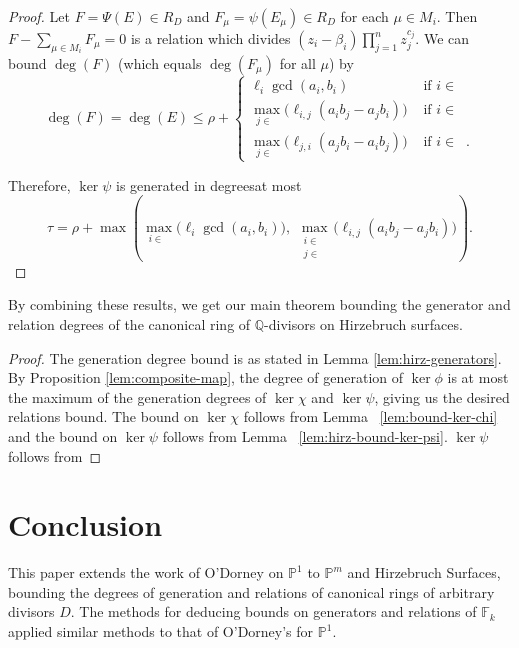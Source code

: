 \documentclass{amsart}
\theoremstyle{plain}
\theoremstyle{definition}
\theoremstyle{remark}
\numberwithin{equation}{section}
\newcommand\bq{{\mathbb Q}}
\newcommand\bp{{\mathbb P}}
\newcommand\bida{a}
\newcommand\bidb{b}
\newcommand\hirz{\mathbb{F}}
\DeclareMathOperator{\Te}{T_=}
\DeclareMathOperator{\Tp}{T_+}
\DeclareMathOperator{\Tm}{T_-}
\begin{document}
\begin{proof}
Let $F = \Psi(E) \in R_D$
 and $F_\mu = \psi(E_\mu) \in R_D$ for each $\mu \in M_i$.  
Then $F - \sum_{\mu \in M_i} F_\mu = 0$ is a relation %
which divides $(z_i - \beta_i) \prod_{j = 1}^n z_j^{c_j}$. 
We can bound $\deg(F)$ (which equals $\deg(F_\mu)$ for all $\mu$) by
\[
	\deg(F) = \deg(E) \le \rho + \begin{cases}
	\ell_i \gcd(\bida_i, \bidb_i)	&\mbox{ if } i \in \Te \\
	\max_{j \in \Tm} \bigl(\ell_{i, j} (\bida_i \bidb_j - \bida_j \bidb_i)\bigr)
	&\mbox{ if } i \in \Tp \\
	\max_{j \in \Tp} \bigl(\ell_{j, i} (\bida_j \bidb_ i - \bida_i \bidb_j) \bigr)
	&\mbox{ if } i \in \Tm. \end{cases}
	\]

\noindent
Therefore, $\ker \psi$ is generated in degreesat most
\[
	\tau = \rho
	+ \max \left(\max_{i\in \Te} \bigl(\ell_i \gcd(a_i, b_i) \bigr),
	\; \max_{\substack{i \in \Tp \\ j \in \Tm}} \bigl(\ell_{i, j}
	(\bida_i \bidb_j - \bida_j
	\bidb_i) \bigr) \right).
\]
\end{proof}

By combining these results, we get our main theorem bounding
the generator and relation degrees of the canonical ring of
$\bq$-divisors on Hirzebruch surfaces.

\hirzrestate*

\begin{proof}
The generation degree bound is as stated in Lemma \ref{lem:hirz-generators}.
By Proposition \ref{lem:composite-map}, the degree of generation of
$\ker \phi$ is at most the maximum of the generation degrees of $\ker \chi$
and $\ker \psi$, giving us the desired relations bound. The bound on $\ker \chi$
follows from Lemma ~\ref{lem:bound-ker-chi} and the bound on $\ker \psi$
follows from Lemma ~\ref{lem:hirz-bound-ker-psi}.
$\ker \psi$ follows from 
\end{proof}


\section{Conclusion}
\label{sec:conc}
This paper extends the work of O'Dorney \cite{dorney:canonical} on $\bp^1$ to
$\bp^m$ and Hirzebruch Surfaces, bounding the degrees of generation and
relations of canonical rings of arbitrary divisors $D$.  The methods for
deducing bounds on generators and relations of $\hirz_k$ applied similar
methods to that of O'Dorney's for $\bp^1$.  
\end{document}
